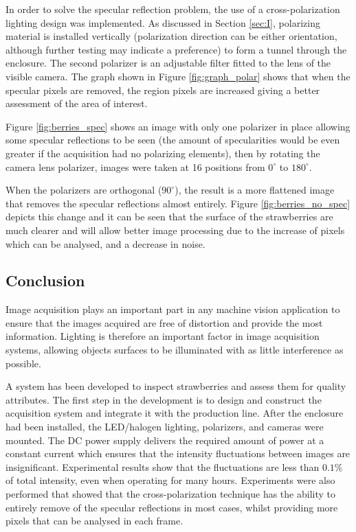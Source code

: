 \documentclass[fleqn,twoside]{article}
\begin{document}
In order to solve the specular reflection problem, the use of a cross-polarization lighting design was implemented. As discussed in Section \ref{sec:I}, polarizing material is installed vertically (polarization direction can be either orientation, although further testing may indicate a preference) to form a tunnel through the enclosure. The second polarizer is an adjustable filter fitted to the lens of the visible camera. The graph shown in Figure \ref{fig:graph_polar} shows that when the specular pixels are removed, the region pixels are increased giving a better assessment of the area of interest.



Figure \ref{fig:berries_spec} shows an image with only one polarizer in place allowing some specular reflections to be seen (the amount of specularities would be even greater if the acquisition had no polarizing elements), then by rotating the camera lens polarizer, images were taken at 16 positions from $0^{\circ}$ to $180^{\circ}$.  


When the polarizers are orthogonal ($90^{\circ}$), the result is a more flattened image that removes the specular reflections almost entirely.  Figure \ref{fig:berries_no_spec} depicts this change and it can be seen that the surface of the strawberries are much clearer and will allow better image processing due to the increase of pixels which can be analysed, and a decrease in noise. 



\subsection{Conclusion}

Image acquisition plays an important part in any machine vision application to ensure that the images acquired are free of distortion and provide the most information. Lighting is therefore an important factor in image acquisition systems, allowing objects surfaces to be illuminated with as little interference as possible.

A system has been developed to inspect strawberries and assess them for quality attributes. The first step in the development is to design and construct the acquisition system and integrate it with the production line. After the enclosure had been installed, the LED/halogen lighting, polarizers, and cameras were mounted. The DC power supply delivers the required amount of power at a constant current which ensures that the intensity fluctuations between images are insignificant. Experimental results show that the fluctuations are less than $0.1\%$ of total intensity, even when operating for many hours. Experiments were also performed that showed that the cross-polarization technique has the ability to entirely remove of the specular reflections in most cases, whilst providing more pixels that can be analysed in each frame.  
\end{document}
